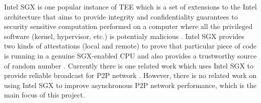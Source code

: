 Intel SGX is one popular instance of TEE which is a set of extensions to the Intel architecture that aims to provide integrity and confidentiality guarantees to security sensitive computation performed on a computer where all the privileged software (kernel, hypervisor, etc.) is potentialy malicious \cite{costan2016intel}. Intel SGX provides two kinds of attestations (local and remote) to prove that particular piece of code is running in a genuine SGX-enabled CPU \cite{2018arXiv180802252C} and also provides a trustworthy source of random number \cite{intelsgx}. Currently there is one related work which uses Intel SGX to provide reliable broadcast for P2P network \cite{jia2017robust}. However, there is no related work on using Intel SGX to improve asynchronous P2P network performance, which is the main focus of this project.



